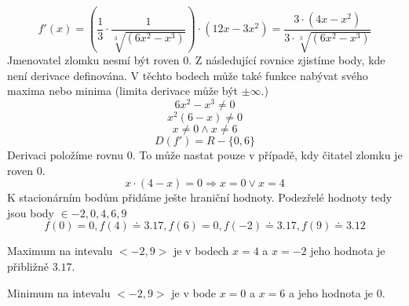 \begin{displaymath}
f'(x)=\left(\frac{1}{3}\cdot\frac{1}{\sqrt[3]{(6x^2-x^3)}}\right)\cdot(12x-3x^2)=\frac{3\cdot(4x-x^2)}{3\cdot\sqrt[3]{(6x^2-x^3)}}
\end{displaymath}
Jmenovatel zlomku nesmí být roven 0. Z následující rovnice zjistíme body, kde není derivace definována. V těchto bodech může také funkce nabývat svého maxima nebo minima (limita derivace může být $\pm \infty$.)
\begin{displaymath}
6x^2-x^3\neq0
\end{displaymath}
\begin{displaymath}
x^2(6-x)\neq0
\end{displaymath}
\begin{displaymath}
x\neq0 \wedge  x\neq6
\end{displaymath}
\begin{displaymath}
D(f')=R-\{0,6\}
\end{displaymath}
Derivaci položíme rovnu 0. To může nastat pouze v případě, kdy čitatel zlomku je roven 0.
\begin{displaymath}
x\cdot(4-x) = 0 \Rightarrow x = 0 \vee x = 4
\end{displaymath}
K stacionárním bodům přidáme ješte hraniční hodnoty. 
Podezřelé hodnoty tedy jsou body $ \in{-2,0,4,6,9} $
\begin{displaymath}
f(0) = 0, f(4) \doteq 3.17, f(6) = 0, f(-2) \doteq 3.17, f(9) \doteq 3.12
\end{displaymath}

Maximum na intevalu $ <-2,9>$ je v bodech $x=4$ a $x=-2$ jeho hodnota je přibližně $3.17$.

Minimum na intevalu $ <-2,9>$ je v bode $x=0$ a $x=6$ a jeho hodnota je $0$.
